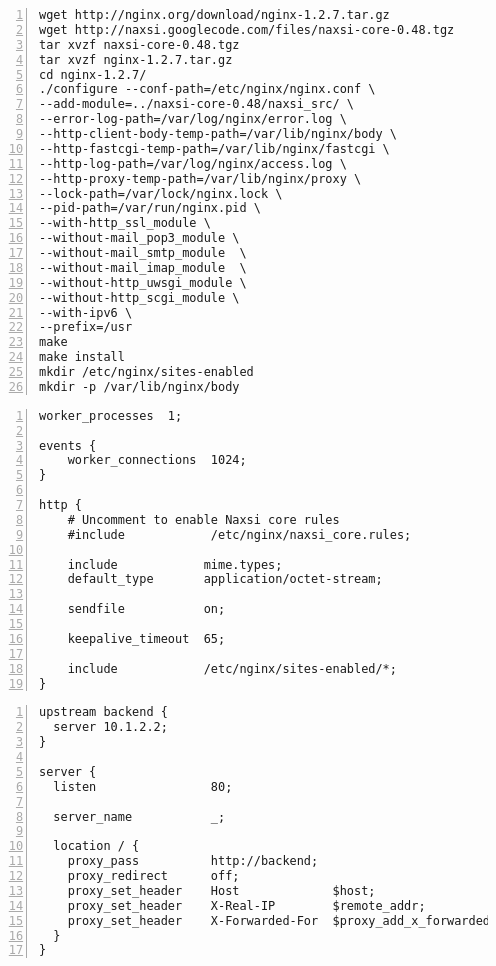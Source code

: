 \documentclass[Configuration]{subfiles}
\begin{document}
\begin{lstlisting}[frame=single,caption=Compiling nginx+naxsi,backgroundcolor=\color{gray},breaklines=true,numbers=left,]
wget http://nginx.org/download/nginx-1.2.7.tar.gz
wget http://naxsi.googlecode.com/files/naxsi-core-0.48.tgz
tar xvzf naxsi-core-0.48.tgz
tar xvzf nginx-1.2.7.tar.gz
cd nginx-1.2.7/
./configure --conf-path=/etc/nginx/nginx.conf \
--add-module=../naxsi-core-0.48/naxsi_src/ \
--error-log-path=/var/log/nginx/error.log \
--http-client-body-temp-path=/var/lib/nginx/body \
--http-fastcgi-temp-path=/var/lib/nginx/fastcgi \
--http-log-path=/var/log/nginx/access.log \
--http-proxy-temp-path=/var/lib/nginx/proxy \
--lock-path=/var/lock/nginx.lock \
--pid-path=/var/run/nginx.pid \
--with-http_ssl_module \
--without-mail_pop3_module \
--without-mail_smtp_module  \
--without-mail_imap_module  \
--without-http_uwsgi_module \
--without-http_scgi_module \
--with-ipv6 \
--prefix=/usr
make
make install
mkdir /etc/nginx/sites-enabled
mkdir -p /var/lib/nginx/body
\end{lstlisting}

\begin{lstlisting}[frame=single,caption=/etc/nginx/nginx.conf,backgroundcolor=\color{gray},breaklines=true,numbers=left,]
worker_processes  1;

events {
    worker_connections  1024;
}

http {
    # Uncomment to enable Naxsi core rules
    #include            /etc/nginx/naxsi_core.rules;

    include            mime.types;
    default_type       application/octet-stream;

    sendfile           on;

    keepalive_timeout  65;

    include            /etc/nginx/sites-enabled/*;
}
\end{lstlisting}

\begin{lstlisting}[frame=single,caption=/etc/nginx/sites-enabled/wordpress,backgroundcolor=\color{gray},breaklines=true,numbers=left,]
upstream backend {
  server 10.1.2.2;
}

server {
  listen                80;

  server_name           _;

  location / {
    proxy_pass          http://backend;
    proxy_redirect      off;
    proxy_set_header    Host             $host;
    proxy_set_header    X-Real-IP        $remote_addr;
    proxy_set_header    X-Forwarded-For  $proxy_add_x_forwarded_for;
  }
}
\end{lstlisting}
\end{document}
